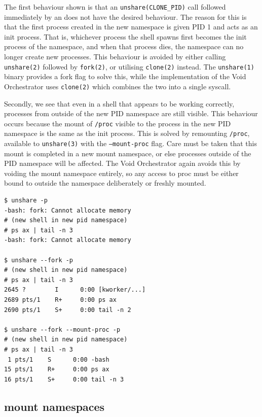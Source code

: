 \documentclass[sigplan]{acmart}
\begin{document}
The first behaviour shown is that an \texttt{unshare(CLONE\_PID)} call followed immediately by an  does not have the desired behaviour. The reason for this is that the first process created in the new namespace is given PID 1 and acts as an init process. That is, whichever process the shell spawns first becomes the init process of the namespace, and when that process dies, the namespace can no longer create new processes. This behaviour is avoided by either calling \texttt{unshare(2)} followed by \texttt{fork(2)}, or utilising \texttt{clone(2)} instead. The \texttt{unshare(1)} binary provides a fork flag to solve this, while the implementation of the Void Orchestrator uses \texttt{clone(2)} which combines the two into a single syscall.

Secondly, we see that even in a shell that appears to be working correctly, processes from outside of the new PID namespace are still visible. This behaviour occurs because the mount of \texttt{/proc} visible to the process in the new PID namespace is the same as the init process. This is solved by remounting \texttt{/proc}, available to \texttt{unshare(3)} with the \texttt{---mount-proc} flag. Care must be taken that this mount is completed in a new mount namespace, or else processes outside of the PID namespace will be affected. The Void Orchestrator again avoids this by voiding the mount namespace entirely, so any access to proc must be either bound to outside the namespace deliberately or freshly mounted.

\begin{lstlisting}[float,label={lst:unshare-pid}]
$ unshare -p
-bash: fork: Cannot allocate memory
# (new shell in new pid namespace)
# ps ax | tail -n 3
-bash: fork: Cannot allocate memory

$ unshare --fork -p
# (new shell in new pid namespace)
# ps ax | tail -n 3
2645 ?        I      0:00 [kworker/...]
2689 pts/1    R+     0:00 ps ax
2690 pts/1    S+     0:00 tail -n 2

$ unshare --fork --mount-proc -p
# (new shell in new pid namespace)
# ps ax | tail -n 3
 1 pts/1    S      0:00 -bash
15 pts/1    R+     0:00 ps ax
16 pts/1    S+     0:00 tail -n 3

\end{lstlisting}

\subsection{mount namespaces}
\label{sec:voiding-mount}
\end{document}

